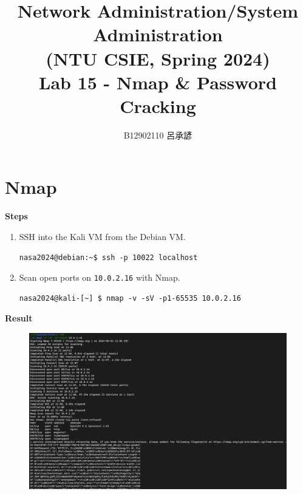 \documentclass[12pt, a4paper]{article}
\title{
  \vspace{-1cm}
  Network Administration/System Administration\\
  (NTU CSIE, Spring 2024)\\
  Lab 15 - Nmap \& Password Cracking
}
\author{\Large B12902110 呂承諺}
\begin{document}
  \maketitle

  \section{Nmap}
  \textbf{Steps}
  \begin{enumerate}
    \item SSH into the Kali VM from the Debian VM.
    \begin{Verbatim}[frame=single]
nasa2024@debian:~$ ssh -p 10022 localhost
    \end{Verbatim}
    \item Scan open ports on \verb|10.0.2.16| with Nmap.
    \begin{Verbatim}[frame=single]
nasa2024@kali-[~] $ nmap -v -sV -p1-65535 10.0.2.16
    \end{Verbatim}
  \end{enumerate}

  \textbf{Result}
  \begin{figure}[H]
    \includegraphics[width=\linewidth]{nmap.png}
  \end{figure}
\end{document}
